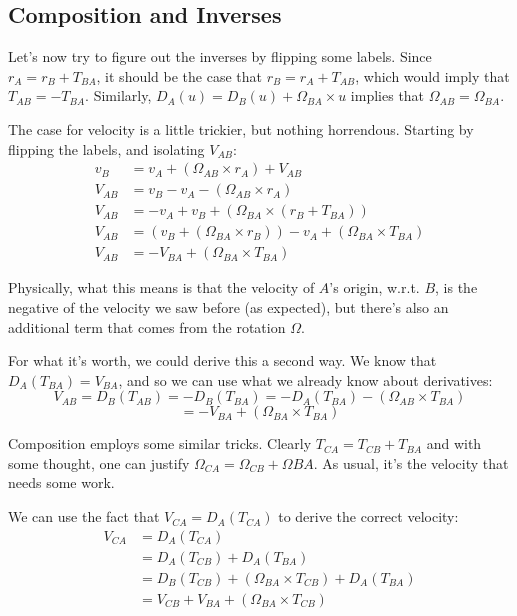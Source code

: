 \documentclass{article}
\numberwithin{equation}{subsection}
\begin{document}
\subsection{Composition and Inverses}

Let's now try to figure out the inverses by flipping some labels. Since $r_A = r_B + T_{BA}$, it should be the case that $r_B = r_A + T_{AB}$, which would imply that $T_{AB} = -T_{BA}$. Similarly, $D_A(u) = D_B(u) + \Omega_{BA} \times u$ implies that $\Omega_{AB} = \Omega_{BA}$.

The case for velocity is a little trickier, but nothing horrendous. Starting by flipping the labels, and isolating $V_{AB}$:
\begin{align*}
v_B &= v_A + (\Omega_{AB} \times r_A) + V_{AB} \\
V_{AB} &= v_B - v_A - (\Omega_{AB} \times r_A) \\
V_{AB} &= -v_A + v_B + (\Omega_{BA} \times (r_B + T_{BA})) \\
V_{AB} &= (v_B + (\Omega_{BA} \times r_B)) - v_A + (\Omega_{BA} \times T_{BA}) \\
V_{AB} &= -V_{BA} + (\Omega_{BA} \times T_{BA})
\end{align*}

Physically, what this means is that the velocity of $A$'s origin, w.r.t. $B$, is the negative of the velocity we saw before (as expected), but there's also an additional term that comes from the rotation $\Omega$.

For what it's worth, we could derive this a second way. We know that $D_A(T_{BA}) = V_{BA}$, and so we can use what we already know about derivatives:
\[ V_{AB} = D_B(T_{AB}) = -D_B(T_{BA}) = -D_A(T_{BA}) - (\Omega_{AB} \times T_{BA}) \]
\[ = -V_{BA} + (\Omega_{BA} \times T_{BA}) \]

Composition employs some similar tricks. Clearly $T_{CA} = T_{CB} + T_{BA}$ and with some thought, one can justify $\Omega_{CA} = \Omega_{CB} + \Omega{BA}$. As usual, it's the velocity that needs some work.

We can use the fact that $V_{CA} = D_A(T_{CA})$ to derive the correct velocity:
\begin{align*}
V_{CA} &= D_A(T_{CA}) \\
&= D_A(T_{CB}) + D_A(T_{BA}) \\
&= D_B(T_{CB}) + (\Omega_{BA} \times T_{CB}) + D_A(T_{BA}) \\
&= V_{CB} + V_{BA} + (\Omega_{BA} \times T_{CB})
\end{align*}
\end{document}

